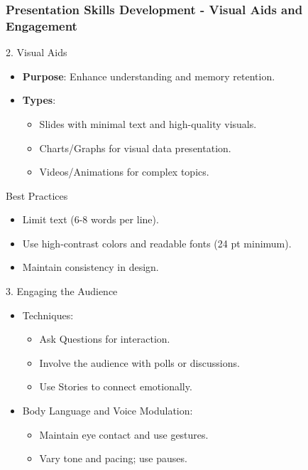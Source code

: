 \documentclass[aspectratio=169]{beamer}
\begin{document}
\begin{frame}[fragile]
    \frametitle{Presentation Skills Development - Visual Aids and Engagement}
    \begin{block}{2. Visual Aids}
        \begin{itemize}
            \item \textbf{Purpose}: Enhance understanding and memory retention.
            \item \textbf{Types}:
            \begin{itemize}
                \item Slides with minimal text and high-quality visuals.
                \item Charts/Graphs for visual data presentation.
                \item Videos/Animations for complex topics.
            \end{itemize}
        \end{itemize}
        \begin{block}{Best Practices}
            \begin{itemize}
                \item Limit text (6-8 words per line).
                \item Use high-contrast colors and readable fonts (24 pt minimum).
                \item Maintain consistency in design.
            \end{itemize}
        \end{block}
    \end{block}

    \begin{block}{3. Engaging the Audience}
        \begin{itemize}
            \item Techniques:
            \begin{itemize}
                \item Ask Questions for interaction.
                \item Involve the audience with polls or discussions.
                \item Use Stories to connect emotionally.
            \end{itemize}
            \item Body Language and Voice Modulation:
            \begin{itemize}
                \item Maintain eye contact and use gestures.
                \item Vary tone and pacing; use pauses.
            \end{itemize}
        \end{itemize}
    \end{block}
\end{frame}
\end{document}
